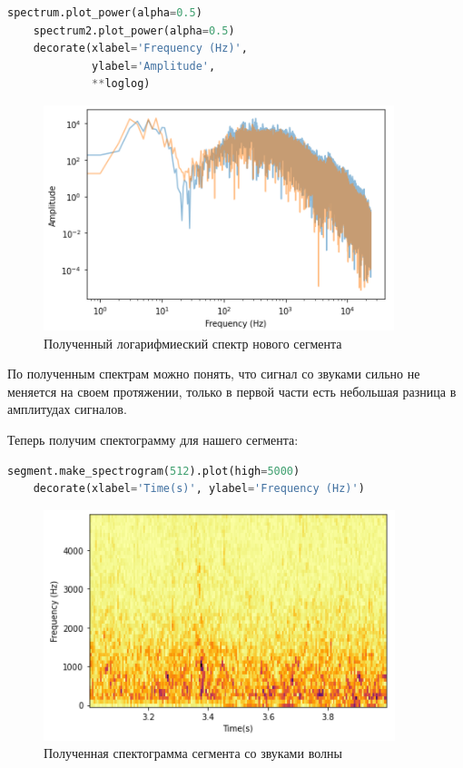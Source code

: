 \documentclass[a4paper]{article}
\begin{document}
\begin{lstlisting}[language=Python, caption= Получение логарифмиеского спектра нового сегмента]
    spectrum.plot_power(alpha=0.5)
    spectrum2.plot_power(alpha=0.5)
    decorate(xlabel='Frequency (Hz)',
             ylabel='Amplitude',
             **loglog)
\end{lstlisting}               
            
            \begin{figure}[H]
                \centering
                \includegraphics{ex_1_wave_second_log_spectr.png}
                \caption{Полученный логарифмиеский спектр нового сегмента}
                \label{fig:ex_1_wave_second_log_spectr}
            \end{figure}
            
            По полученным спектрам можно понять, что сигнал со звуками сильно не меняется на своем протяжении, только в первой части есть небольшая разница в амплитудах сигналов.
            
            Теперь получим спектограмму для нашего сегмента:
            
\begin{lstlisting}[language=Python, caption= Получение спектограммы для сегмента]
    segment.make_spectrogram(512).plot(high=5000)
    decorate(xlabel='Time(s)', ylabel='Frequency (Hz)')
\end{lstlisting}               
            
            \begin{figure}[H]
                \centering
                \includegraphics{ex_1_wave_spectogramma.png}
                \caption{Полученная спектограмма сегмента со звуками волны}
                \label{fig:ex_1_wave_spectogramma}
            \end{figure}
    
\end{document}
